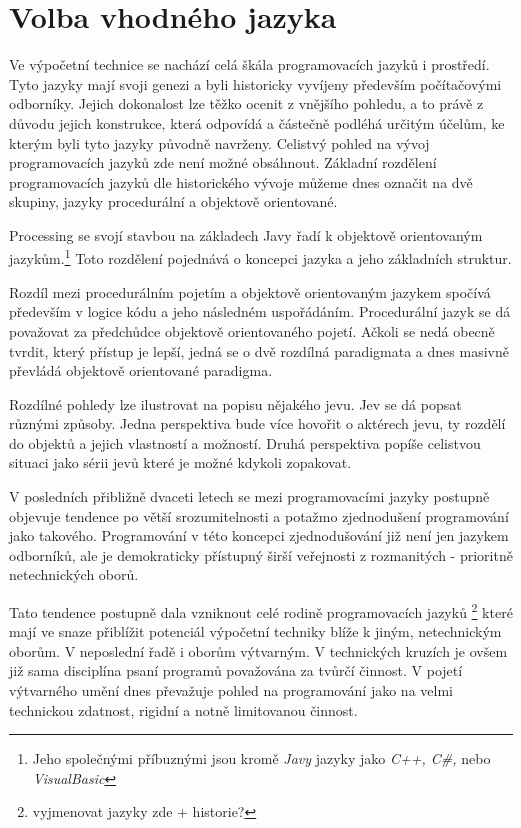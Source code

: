 \documentclass[11pt]{book}
\newcommand{\oddil}[1]{\section{#1}\label{sec:#1}}
\begin{document}
\oddil{Volba vhodného jazyka}


Ve výpočetní technice se nachází celá škála programovacích jazyků i prostředí. Tyto jazyky mají svoji genezi a byli historicky vyvíjeny především počítačovými odborníky. Jejich dokonalost lze těžko ocenit z vnějšího pohledu, a to právě z důvodu jejich konstrukce, která odpovídá a částečně podléhá určitým účelům, ke kterým byli tyto jazyky původně navrženy. Celistvý pohled na vývoj programovacích jazyků zde není možné obsáhnout. Základní rozdělení programovacích jazyků dle historického vývoje můžeme dnes označit na dvě skupiny, jazyky procedurální a objektově orientované.

Processing se svojí stavbou na základech Javy řadí k objektově orientovaným jazykům.\footnote{ Jeho společnými příbuznými jsou kromě {\em Javy} jazyky jako {\em C++, C\#,} nebo {\em VisualBasic}} Toto rozdělení pojednává o koncepci jazyka a jeho základních struktur. 

Rozdíl mezi procedurálním pojetím a objektově orientovaným jazykem spočívá především v logice kódu a jeho následném uspořádáním. Procedurální jazyk se dá považovat za předchůdce objektově orientovaného pojetí. Ačkoli se nedá obecně tvrdit, který přístup je lepší, jedná se o dvě rozdílná paradigmata a dnes masivně převládá objektově orientované paradigma.

Rozdílné pohledy lze ilustrovat na popisu nějakého jevu. Jev se dá popsat různými způsoby. Jedna perspektiva bude více hovořit o aktérech jevu, ty rozdělí do objektů a jejich vlastností a možností. Druhá perspektiva popíše celistvou situaci jako sérii jevů které je možné kdykoli zopakovat.


V posledních přibližně dvaceti letech se mezi programovacími jazyky postupně objevuje tendence po větší srozumitelnosti a potažmo zjednodušení programování jako takového. Programování v této koncepci zjednodušování již není jen jazykem odborníků, ale je demokraticky přístupný širší veřejnosti z rozmanitých - prioritně netechnických oborů.

Tato tendence postupně dala vzniknout celé rodině programovacích jazyků
\footnote{vyjmenovat jazyky zde + historie?}
které mají ve snaze přiblížit potenciál výpočetní techniky blíže k jiným, netechnickým oborům. V neposlední řadě i oborům výtvarným. V technických kruzích je ovšem již sama disciplína psaní programů považována za tvůrčí činnost. V pojetí výtvarného umění dnes převažuje pohled na programování jako na velmi technickou zdatnost, rigidní a notně limitovanou činnost.
\end{document}
